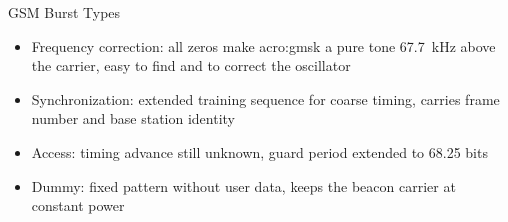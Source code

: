 \begin{frame}{GSM Burst Types}
  \centering
  

  \vspace{0.5em}
  \raggedright
  \begin{itemize}
    \item Frequency correction: all zeros make \gls{acro:gmsk} a pure tone \qty{67.7}{\kilo\hertz} above the carrier, easy to find and to correct the oscillator
    \item Synchronization: extended training sequence for coarse timing, carries frame number and base station identity
    \item Access: timing advance still unknown, guard period extended to \num{68.25} bits
    \item Dummy: fixed pattern without user data, keeps the beacon carrier at constant power
  \end{itemize}
\end{frame}


